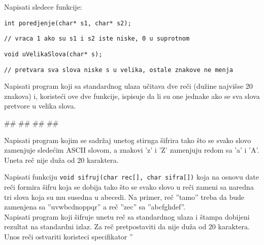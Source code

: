 \begin{Exercise}[label=p2.3_] 
 Napisati sledece funkcije:

\verb|int poredjenje(char* s1, char* s2);|

\verb|// vraca 1 ako su s1 i s2 iste niske, 0 u suprotnom|
\vspace*{2mm}

\verb|void uVelikaSlova(char* s);|

\verb|// pretvara sva slova niske s u velika, ostale znakove ne menja|

Napisati program koji sa standardnog ulaza u\v{c}itava dve re\v{c}i (du\v{z}ine
najvi\v{s}se 20 znakova) i, koriste\'ci ove dve funkcije, ispisuje da li su
one jednake ako se sva slova pretvore u velika slova. \\
\begin{miditest}
\begin{upotreba}{1}
#\naslovInt#
##
##
##
\end{upotreba}
\end{miditest}
\end{Exercise}
\begin{Answer}[ref=p2.3_]
\end{Answer}


\begin{Exercise}[label=p2.3_] 
Napisati program kojim se sadr\v zaj unetog stirnga \v sifrira tako \v
sto se svako slovo zamenjuje slede\'cim ASCII slovom, a znakovi ’z' i
'Z' zamenjuju redom sa 'a' i ’A’.  Uneta re\v c nije du\v za od 20
karaktera.
\end{Exercise}
\begin{Answer}[ref=p2.3_]
\end{Answer}


\begin{Exercise}[label=p2.3_] 
Napisati funkciju \verb|void sifruj(char rec[], char sifra[])|
koja na osnovu date re\v ci formira \v sifru koja se dobija tako \v sto se
svako slovo u re\v ci zameni sa naredna tri slova koja su mu susedna u abecedi. 
Na primer, re\v c ”tamo” treba da bude zamenjena sa ”uvwbcdnoppqr” a re\v c ”zec”
sa ”abcfghdef”. \\
Napisati program koji \v sifruje unetu re\v c sa standardnog ulaza i \v stampa
dobijeni rezultat na standardni izlaz. Za re\v c pretpostaviti da nije 
du\v za od 20 karaktera. Unos re\v ci ostvariti koristeci specifikator ”%
\end{Exercise}
\begin{Answer}[ref=p2.3_]
\end{Answer}


